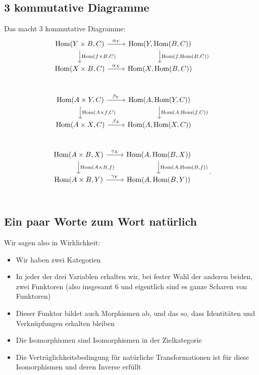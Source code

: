\documentclass[a4paper]{amsart}
\theoremstyle{definition}
\DeclareMathOperator{\Hom}{Hom}
\begin{document}
\subsection{3 kommutative Diagramme}
Das macht 3 kommutative Diagramme:
\begin{equation}
   \begin{tikzcd}
      \Hom( Y \times B, C ) \arrow[r, "\alpha_Y"] \arrow[d, "{\Hom( f \times B, C )}"]
      & \Hom( Y, \Hom( B, C)) \arrow[d, "{\Hom( f, \Hom( B, C))}"]\\
      \Hom( X \times B, C ) \arrow[r, "\alpha_X"]  
      & \Hom( X, \Hom( B, C))\\
   \end{tikzcd}
\end{equation}
\begin{equation}
   \begin{tikzcd}
      \Hom( A \times Y, C ) \arrow[r, "\beta_Y"] \arrow[d, "{\Hom( A \times f, C )}"]
      & \Hom( A, \Hom( Y, C)) \arrow[d, "{\Hom( A, \Hom( f, C))}"]\\
      \Hom( A \times X, C ) \arrow[r, "\beta_X"]  
      & \Hom( A, \Hom( X, C))\\
   \end{tikzcd}
\end{equation}
\begin{equation}
   \begin{tikzcd}
      \Hom( A \times B, X ) \arrow[r, "\gamma_X"] \arrow[d, "{\Hom( A \times B, f )}"]
      & \Hom( A, \Hom( B, X)) \arrow[d, "{\Hom( A, \Hom( B, f))}"]\\
      \Hom( A \times B, Y ) \arrow[r, "\gamma_Y"]  
      & \Hom( A, \Hom( B, Y))\\
   \end{tikzcd}.
\end{equation}

\subsection{Ein paar Worte zum Wort natürlich}
Wir sagen also in Wirklichkeit:
\begin{itemize}
   \item Wir haben zwei Kategorien
   \item In jeder der drei Variablen erhalten wir, bei fester Wahl der anderen beiden, zwei Funktoren (also insgesamt 6 und eigentlich sind es ganze Scharen von Funktoren)
   \item Dieser Funktor bildet auch Morphismen ab, und das so, dass Identitäten und Verknüpfungen erhalten bleiben
   \item Die Isomorphismen sind Isomorphismen in der Zielkategorie
   \item Die Verträglichkeitsbedingung für natürliche Transformationen ist für diese Isomorphismen und deren Inverse erfüllt
\end{itemize}
\end{document}
